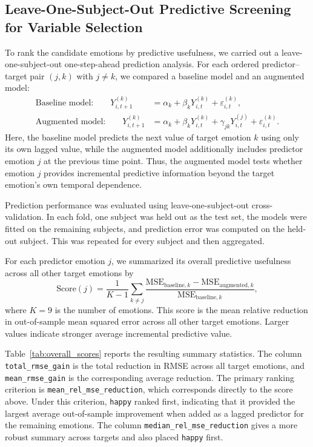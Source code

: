 \documentclass[12pt,letterpaper,fleqn]{article}
\begin{document}
\subsection{Leave-One-Subject-Out Predictive Screening for Variable Selection}
\label{app:loo_screening}


To rank the candidate emotions by predictive usefulness, we carried out a leave-one-subject-out one-step-ahead prediction analysis. For each ordered predictor--target pair $(j,k)$ with $j \neq k$, we compared a baseline model and an augmented model:
\begin{align}
\text{Baseline model:}\qquad
Y_{i,t+1}^{(k)} &= \alpha_k + \beta_k Y_{i,t}^{(k)} + \varepsilon_{i,t}^{(k)}, \\
\text{Augmented model:}\qquad
Y_{i,t+1}^{(k)} &= \alpha_k + \beta_k Y_{i,t}^{(k)} + \gamma_{jk} Y_{i,t}^{(j)} + \varepsilon_{i,t}^{(k)}.
\end{align}
Here, the baseline model predicts the next value of target emotion $k$ using only its own lagged value, while the augmented model additionally includes predictor emotion $j$ at the previous time point. Thus, the augmented model tests whether emotion $j$ provides incremental predictive information beyond the target emotion's own temporal dependence.

Prediction performance was evaluated using leave-one-subject-out cross-validation. In each fold, one subject was held out as the test set, the models were fitted on the remaining subjects, and prediction error was computed on the held-out subject. This was repeated for every subject and then aggregated.

For each predictor emotion $j$, we summarized its overall predictive usefulness across all other target emotions by
\begin{equation}
\mathrm{Score}(j)
=
\frac{1}{K-1}
\sum_{k \ne j}
\frac{\mathrm{MSE}_{\text{baseline},k}-\mathrm{MSE}_{\text{augmented},k}}
{\mathrm{MSE}_{\text{baseline},k}},
\end{equation}
where $K=9$ is the number of emotions. This score is the mean relative reduction in out-of-sample mean squared error across all other target emotions. Larger values indicate stronger average incremental predictive value.

Table~\ref{tab:overall_scores} reports the resulting summary statistics. The column \texttt{total\_rmse\_gain} is the total reduction in RMSE across all target emotions, and \texttt{mean\_rmse\_gain} is the corresponding average reduction. The primary ranking criterion is \texttt{mean\_rel\_mse\_reduction}, which corresponds directly to the score above. Under this criterion, \texttt{happy} ranked first, indicating that it provided the largest average out-of-sample improvement when added as a lagged predictor for the remaining emotions. The column \texttt{median\_rel\_mse\_reduction} gives a more robust summary across targets and also placed \texttt{happy} first.
\end{document}
